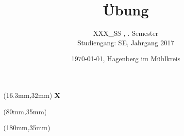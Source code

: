 \usepackage{fancyhdr}
\pagestyle{fancy}
\fancyhf{}
 \chead{} 
\lfoot{} \cfoot  {\Verfasser} \rfoot{\thepage} 
\renewcommand{\headrulewidth}{0.2pt}
\renewcommand{\footrulewidth}{0.2pt}
\renewcommand\lstlistingname{Quellcode} 
\renewcommand\lstlistlistingname{Quellcodeverzeichnis}

\title{Übung \UeNummer}
\subtitle{%
	XXX\_SS , \Semester. Semester\\
	Studiengang: SE, Jahrgang 2017}
\author{\Verfasser  \Matrikel}
\date{\today{}, Hagenberg im Mühlkreis}



	\begin{Large}
		\begin{textblock*}{50mm}(16.3mm,32mm)
			\textsf{\textbf{X}}
		\end{textblock*}
		\begin{textblock*}{50mm}(80mm,35mm)
			\textsf{\textbf{\Verfasser}}
		\end{textblock*}
		\begin{textblock*}{50mm}(180mm,35mm)
			\textsf{\textbf{\Zeit}}
		\end{textblock*}
	\end{Large}
	
	
	
	
	\maketitle
	\vspace{20mm}
	\tableofcontents
	\lstlistoflistings
	\listoffigures
	\newpage